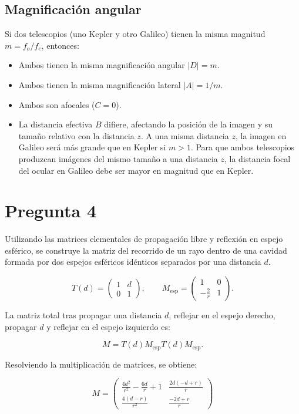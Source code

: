 \documentclass[11pt]{article}
\begin{document}
\subsection*{Magnificación angular}
Si dos telescopios (uno Kepler y otro Galileo) tienen la misma magnitud \(m=f_o/f_e\), entonces:

\begin{itemize}
  \item Ambos tienen la misma magnificación angular \(|D| = m\).
  \item Ambos tienen la misma magnificación lateral \(|A| = 1/m\).
  \item Ambos son afocales (\(C=0\)).
  \item La distancia efectiva \(B\) difiere, afectando la posición de la imagen y su tamaño relativo con la distancia \(z\). A una misma distancia \(z\), la imagen en Galileo será más grande que en Kepler si \(m > 1\). Para que ambos telescopios produzcan imágenes del mismo tamaño a una distancia \(z\), la distancia focal del ocular en Galileo debe ser mayor en magnitud que en Kepler.
\end{itemize}

\section*{Pregunta 4}

Utilizando las matrices elementales de propagación libre y reflexión en espejo esférico, se construye la matriz del recorrido de un rayo dentro de una cavidad formada por dos espejos esféricos idénticos separados por una distancia \(d\).

\[
T(d) = \begin{pmatrix} 1 & d \\ 0 & 1 \end{pmatrix},
\qquad M_{\text{esp}} = \begin{pmatrix} 1 & 0 \\ -\frac{2}{r} & 1 \end{pmatrix}.
\]

La matriz total tras propagar una distancia \(d\), reflejar en el espejo derecho, propagar \(d\) y reflejar en el espejo izquierdo es:

\[
M = T(d) M_{\text{esp}} T(d) M_{\text{esp}}.
\]

Resolviendo la multiplicación de matrices, se obtiene:

\[
M = \begin{pmatrix}\frac{4 d^{2}}{r^{2}} - \frac{6 d}{r} + 1 & \frac{2 d \left(- d + r\right)}{r}\\\frac{4 \left(d - r\right)}{r^{2}} & \frac{- 2 d + r}{r}\end{pmatrix}
\]
\end{document}
